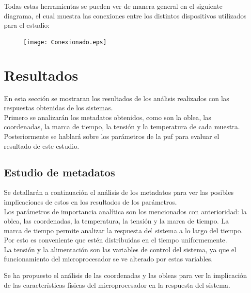 \documentclass[spanish]{template/minim}
\begin{document}
Todas estas herramientas se pueden ver de manera general en el siguiente diagrama, el cual muestra las conexiones entre los distintos dispositivos utilizados para el estudio:

\begin{figure}[H]
    \centering
    \texttt{[image: Conexionado.eps]}
\end{figure}



\section{Resultados}\label{sec:results}

En esta sección se mostraran los resultados de los análisis realizados con las respuestas obtenidas de los sistemas.\\

Primero se analizarán los metadatos obtenidos, como son la oblea, las coordenadas, la marca de tiempo, la tensión y la temperatura de cada muestra. Posteriormente se hablará sobre los parámetros de la \gls{puf} para evaluar el resultado de este estudio.\\

\subsection{Estudio de metadatos}\label{sec:metadata_results}

Se detallarán a continuación el análisis de los metadatos para ver las posibles implicaciones de estos en los resultados de los parámetros.\\

Los parámetros de importancia analítica son los mencionados con anterioridad: la oblea, las coordenadas, la temperatura, la tensión y la marca de tiempo. La marca de tiempo permite analizar la respuesta del sistema a lo largo del tiempo. Por esto es conveniente que estén distribuidas en el tiempo uniformemente.\\La tensión y la alimentación son las variables de control del sistema, ya que el funcionamiento del microprocesador se ve alterado por estas variables.

Se ha propuesto el análisis de las coordenadas y las obleas para ver la implicación de las características físicas del microprocesador en la respuesta del sistema.\\
\end{document}
